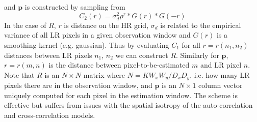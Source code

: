 and $\bm{p}$ is constructed by sampling from
\begin{equation}
    C_2(r) = \sigma_d^2 \rho^{r} \ast G(r) \ast G(-r)
\end{equation}
In the case of $R$, $r$ is distance on the HR grid, $\sigma_d$ is related to the empirical variance of all LR pixels in a given observation window and $G(r)$ is a smoothing kernel (e.g. gaussian).
%
Thus by evaluating $C_1$ for all $r = r(n_1, n_2)$ distances between LR pixels $n_1$, $n_2$ we can construct $R$.
%
Similarly for $\bm{p}$, $r = r(m, n)$ is the distance between pixel-to-be-estimated $m$ and LR pixel $n$.
%
Note that $R$ is an $N \times N$ matrix where $N = K W_x W_y/D_x D_y$, i.e. how many LR pixels there are in the observation window, and $\bm{p}$ is an $N \times 1$ column vector uniquely computed for each pixel in the estimation window.
%
The scheme is effective but suffers from issues with the spatial isotropy of the auto-correlation and cross-correlation models.

